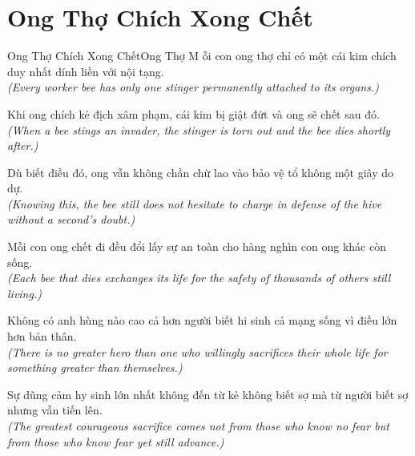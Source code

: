 \section{Ong Thợ Chích Xong Chết}
\begin{truyen}{Ong Thợ Chích Xong Chết}{Ong Thợ}
M ỗi con ong thợ chỉ có một cái kim chích duy nhất dính liền với nội tạng.\\
\textit{(Every worker bee has only one stinger permanently attached to its organs.)}

Khi ong chích kẻ địch xâm phạm, cái kim bị giật đứt và ong sẽ chết sau đó.\\
\textit{(When a bee stings an invader, the stinger is torn out and the bee dies shortly after.)}

Dù biết điều đó, ong vẫn không chần chừ lao vào bảo vệ tổ không một giây do dự.\\
\textit{(Knowing this, the bee still does not hesitate to charge in defense of the hive without a second's doubt.)}

Mỗi con ong chết đi đều đổi lấy sự an toàn cho hàng nghìn con ong khác còn sống.\\
\textit{(Each bee that dies exchanges its life for the safety of thousands of others still living.)}

Không có anh hùng nào cao cả hơn người biết hi sinh cả mạng sống vì điều lớn hơn bản thân.\\
\textit{(There is no greater hero than one who willingly sacrifices their whole life for something greater than themselves.)}

\end{truyen}
\begin{baihoc}
  Sự dũng cảm hy sinh lớn nhất không đến từ kẻ không biết sợ mà từ người biết sợ nhưng vẫn tiến lên.\\
  \textit{(The greatest courageous sacrifice comes not from those who know no fear but from those who know fear yet still advance.)}
\end{baihoc}

